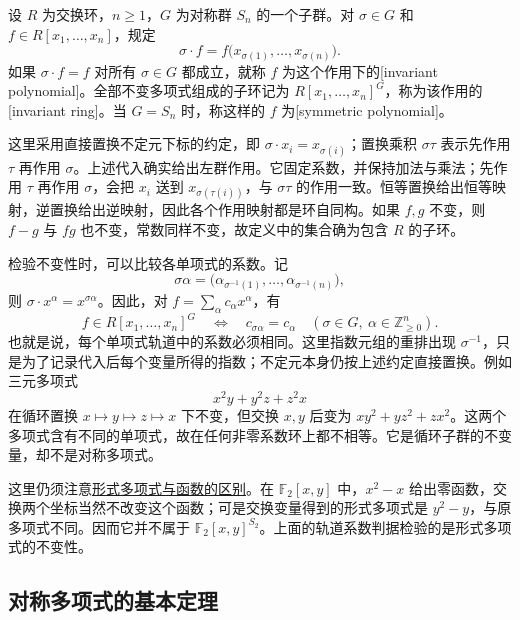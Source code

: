 \begin{definition}\label{b1:def:permutation-invariant-polynomial}
	设 \(R\) 为交换环，\(n\ge1\)，\(G\) 为对称群 \(S_n\) 的一个子群。对 \(\sigma\in G\) 和 \(f\in R[x_1,\ldots,x_n]\)，规定
	\[
		\sigma\cdot f=f\bigl(x_{\sigma(1)},\ldots,x_{\sigma(n)}\bigr).
	\]
	如果 \(\sigma\cdot f=f\) 对所有 \(\sigma\in G\) 都成立，就称 \(f\) 为这个作用下的[invariant polynomial]。全部不变多项式组成的子环记为 \(R[x_1,\ldots,x_n]^G\)，称为该作用的[invariant ring]。当 \(G=S_n\) 时，称这样的 \(f\) 为[symmetric polynomial]。
\end{definition}

这里采用直接置换不定元下标的约定，即 \(\sigma\cdot x_i=x_{\sigma(i)}\)；置换乘积 \(\sigma\tau\) 表示先作用 \(\tau\) 再作用 \(\sigma\)。上述代入确实给出左群作用。它固定系数，并保持加法与乘法；先作用 \(\tau\) 再作用 \(\sigma\)，会把 \(x_i\) 送到 \(x_{\sigma(\tau(i))}\)，与 \(\sigma\tau\) 的作用一致。恒等置换给出恒等映射，逆置换给出逆映射，因此各个作用映射都是环自同构。如果 \(f,g\) 不变，则 \(f-g\) 与 \(fg\) 也不变，常数同样不变，故定义中的集合确为包含 \(R\) 的子环。

\ProseParagraphBreak
检验不变性时，可以比较各单项式的系数。记
\[
	\sigma\alpha= \bigl(\alpha_{\sigma^{-1}(1)},\ldots,\alpha_{\sigma^{-1}(n)}\bigr),
\]
则 \(\sigma\cdot x^\alpha=x^{\sigma\alpha}\)。因此，对 \(f=\sum_\alpha c_\alpha x^\alpha\)，有
\[
	f\in R[x_1,\ldots,x_n]^G \quad\Longleftrightarrow\quad \boxed{c_{\sigma\alpha}=c_\alpha\quad(\sigma\in G,\ \alpha\in\mathbb Z_{\ge0}^n)}.
\]
也就是说，每个单项式轨道中的系数必须相同。这里指数元组的重排出现 \(\sigma^{-1}\)，只是为了记录代入后每个变量所得的指数；不定元本身仍按上述约定直接置换。例如三元多项式
\[
	x^2y+y^2z+z^2x
\]
在循环置换 \(x\mapsto y\mapsto z\mapsto x\) 下不变，但交换 \(x,y\) 后变为 \(xy^2+yz^2+zx^2\)。这两个多项式含有不同的单项式，故在任何非零系数环上都不相等。它是循环子群的不变量，却不是对称多项式。

\ProseParagraphBreak
这里仍须注意\hyperref[b1:note:polynomial-function-distinction]{形式多项式与函数的区别}。在 \(\mathbb F_2[x,y]\) 中，\(x^2-x\) 给出零函数，交换两个坐标当然不改变这个函数；可是交换变量得到的形式多项式是 \(y^2-y\)，与原多项式不同。因而它并不属于 \(\mathbb F_2[x,y]^{S_2}\)。上面的轨道系数判据检验的是形式多项式的不变性。

\subsection{对称多项式的基本定理}
\label{b1:subsec:1204:symmetric-polynomials}

